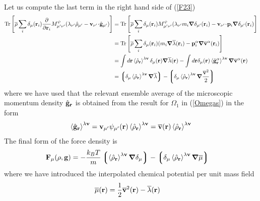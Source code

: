 \documentclass[b5paper,openright,11pt]{book}
\newcommand{\esc}{\!\cdot\!}
\newcommand{\llangle}{\left\langle}
\newcommand{\rrangle}{\right\rangle}
\newcommand{\llg}{\left\lgroup}
\newcommand{\rlg}{\right\rgroup}
\begin{document}
\begin{appendices}
\begin{align}
\label{F23}
\end{align}
Let us compute the last term in the right  hand side of (\ref{F23})
\begin{align}
   {\rm Tr}\left[\overline{\rho}
\sum_i\delta_\mu({\bf r}_i)
\frac{\partial }{\partial {\bf r}_i}
M^\psi_{\mu'\nu'}(\lambda_{\nu'}\hat{\rho}_{\mu'}-{\bf v}_{\nu'}\esc\hat{\bf g}_{\mu'})\right]
&=
   {\rm Tr}\left[\overline{\rho}
\sum_i\delta_\mu({\bf r}_i)
M^\psi_{\mu'\nu'}(\lambda_{\nu'}m_i\boldsymbol{\nabla}\delta_{\mu'}({\bf r}_i)-{\bf v}_{\nu'}\esc{\bf p}_i
\boldsymbol{\nabla}\delta_{\mu'}({\bf r}_i)
\right]
\nonumber\\
&=
   {\rm Tr}\left[\overline{\rho}
\sum_i\delta_\mu({\bf r}_i)
(m_i\boldsymbol{\nabla}\overline{\lambda}({\bf r}_i)-{\bf p}_i^\alpha
\boldsymbol{\nabla}\overline{\bf v}^\alpha({\bf r}_i)
\right]
\nonumber\\
&= \int d{\bf r}\llangle \hat{\rho}_{\bf r}\rrangle^{\lambda{\bf v}}\delta_\mu({\bf r})
\boldsymbol{\nabla}\overline{\lambda}({\bf r})
- \int d{\bf r}\delta_\mu({\bf r})
\llangle \hat{\bf g}^\alpha_{\bf r}\rrangle^{\lambda{\bf v}}\boldsymbol{\nabla}\overline{\bf v}^\alpha({\bf r})
\nonumber\\
&=\llg\delta_\mu\llangle \hat{\rho}_{\bf r}\rrangle^{\lambda{\bf v}}\boldsymbol{\nabla}\overline{\lambda}\rlg
- \llg\delta_\mu\llangle\hat{\rho}_{\bf r}\rrangle^{\lambda{\bf v}}
\boldsymbol{\nabla}\frac{\overline{\bf v}^2}{2}  \rlg \label{f1}
\end{align}
where  we  have  used  that  the  relevant  ensemble  average  of  the
microscopic momentum  density $\hat{\bf  g}_{\bf r}$ is  obtained from
the result for $\Omega_1$ in (\ref{Omegas}) in the form
\begin{align}
  \llangle \hat{\bf g}_{\bf r}\rrangle^{\lambda{\bf v}}={\bf v}_{\mu'}\psi_{\mu'}({\bf r})
\llangle\hat{\rho}_{\bf r}\rrangle^{\lambda{\bf v}}=\overline{\bf v}({\bf r})\llangle\hat{\rho}_{\bf r}\rrangle^{\lambda{\bf v}}
\end{align}
The final form of the force density is 
\begin{align}
  {\bf F}_\mu(\rho,{\bf g})
  &=-\frac{k_BT}{m}\llg\llangle\hat{\rho}_{\bf r}\rrangle^{\lambda{\bf v}}
\boldsymbol{\nabla}\delta_\mu\rlg
-\llg\delta_\mu\llangle\hat{\rho}_{\bf r}\rrangle^{\lambda{\bf v}}\boldsymbol{\nabla}\overline{\mu}\rlg
\end{align} 
where we have introduced the interpolated chemical potential  per unit mass field
\begin{align}
  \overline{\mu}({\bf r}) &=\frac{1}{2}\overline{\bf v}^2({\bf r})-\overline{\lambda}({\bf r})

\end{align}
\end{appendices}
\end{document}
